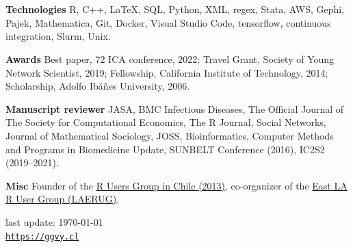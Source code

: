 \documentclass[letterpaper, 10pt]{article}
\newcommand{\myorange}{myteal!70!black}
\newcommand{\darkorange}{\myorange !50!black}
\renewcommand{\textbf}[1]{{\bfseries\color{\myorange}#1}}
\def\footerlink{https://ggvy.cl}
\renewenvironment{itemize}{
  \begin{list}{}{
    \setlength{\leftmargin}{0.45cm}
  }
}{
  \end{list}
}
\begin{document}
\section*{\color{\darkorange}{Honors and Professional Achievements}}

\begin{itemize}
\item \textbf{Technologies} R, C++, \LaTeX, SQL, Python, XML, regex, Stata, AWS, Gephi, Pajek, Mathematica, Git, Docker, Visual Studio Code, tensorflow, continuous integration, Slurm, Unix.
\item \textbf{Awards} Best paper, 72 ICA conference, 2022; Travel Grant, Society of Young Network Scientist, 2019; Fellowship, California Institute of Technology, 2014; Scholarship, Adolfo Ib\'a\~nes University, 2006.
\item \textbf{Manuscript reviewer} JASA, BMC Infectious Diseases, The Official Journal of The Society for Computational Economics, The R Journal, Social Networks, Journal of Mathematical Sociology, JOSS, Bioinformatics, Computer Methods and Programs in Biomedicine Update, SUNBELT Conference (2016), IC2S2 (2019--2021).
\item \textbf{Misc} Founder of the \href{https://www.meetup.com/useRchile/}{R Users Group in Chile (2013)}, co-organizer of the \href{https://socalr.org}{East LA R User Group (LAERUG)}.
\end{itemize}

\bigskip

\begin{center}
 \begin{footnotesize}
   last update: \today \\
   \href{\footerlink}{\texttt{\footerlink}}
 \end{footnotesize}
\end{center}
\end{document}
